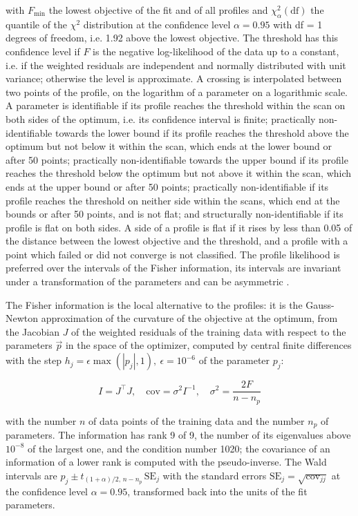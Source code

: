 with $F_{\min}$ the lowest objective of the fit and of all profiles and $\chi^2_{\alpha}(\mathrm{df})$ the quantile of the $\chi^2$ distribution at the confidence level $\alpha = 0.95$ with df = 1 degrees of freedom, i.e. 1.92 above the lowest objective. The threshold has this confidence level if $F$ is the negative log-likelihood of the data up to a constant, i.e. if the weighted residuals are independent and normally distributed with unit variance; otherwise the level is approximate. A crossing is interpolated between two points of the profile, on the logarithm of a parameter on a logarithmic scale. A parameter is identifiable if its profile reaches the threshold within the scan on both sides of the optimum, i.e. its confidence interval is finite; practically non-identifiable towards the lower bound if its profile reaches the threshold above the optimum but not below it within the scan, which ends at the lower bound or after 50 points; practically non-identifiable towards the upper bound if its profile reaches the threshold below the optimum but not above it within the scan, which ends at the upper bound or after 50 points; practically non-identifiable if its profile reaches the threshold on neither side within the scans, which end at the bounds or after 50 points, and is not flat; and structurally non-identifiable if its profile is flat on both sides. A side of a profile is flat if it rises by less than 0.05 of the distance between the lowest objective and the threshold, and a profile with a point which failed or did not converge is not classified. The profile likelihood is preferred over the intervals of the Fisher information, its intervals are invariant under a transformation of the parameters and can be asymmetric \cite{Wieland2021}.

The Fisher information is the local alternative to the profiles: it is the Gauss-Newton approximation of the curvature of the objective at the optimum, from the Jacobian $J$ of the weighted residuals of the training data with respect to the parameters $\vec{p}$ in the space of the optimizer, computed by central finite differences with the step $h_j = \epsilon \max(|p_j|, 1),\ \epsilon = 10^{-6}$ of the parameter $p_j$:

\begin{equation}
I = J^\top J, \quad \mathrm{cov} = \sigma^2 I^{-1}, \quad \sigma^2 = \frac{2 F}{n - n_p}
\end{equation}

with the number $n$ of data points of the training data and the number $n_p$ of parameters. The information has rank 9 of 9, the number of its eigenvalues above $10^{-8}$ of the largest one, and the condition number 1020; the covariance of an information of a lower rank is computed with the pseudo-inverse. The Wald intervals are $\hat{p}_j \pm t_{(1+\alpha)/2,\, n-n_p}\, \mathrm{SE}_j$ with the standard errors $\mathrm{SE}_j = \sqrt{\mathrm{cov}_{jj}}$ at the confidence level $\alpha = 0.95$, transformed back into the units of the fit parameters.

